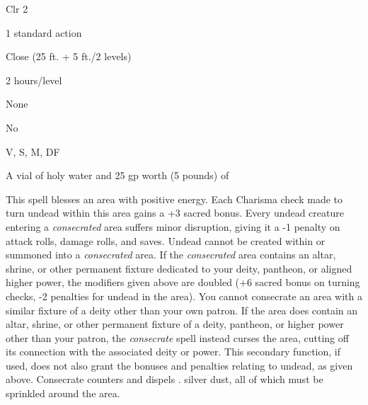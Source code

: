 
\begin{description*}
\item[Level:] Clr 2
\item[Casting Time:] 1 standard action
\item[Range:] Close (25 ft. + 5 ft./2 levels)
\item[Duration:] 2 hours/level
\item[Saving Throw:] None
\item[Spell Resistance:] No
\item[Components:] V, S, M, DF
\item[Arcane Material Component:] A vial of holy water and 25 gp worth (5 pounds) of
\end{description*}

This spell blesses an area with positive energy. Each Charisma check made to turn
undead within this area gains a +3 sacred bonus. Every undead creature entering
a \textit{consecrated} area suffers minor disruption, giving it a -1 penalty on
attack rolls, damage rolls, and saves. Undead cannot be created within or summoned
into a \textit{consecrated} area.
If the \textit{consecrated} area contains an altar, shrine, or other permanent
fixture dedicated to your deity, pantheon, or aligned higher power, the modifiers
given above are doubled (+6 sacred bonus on turning checks, -2 penalties for undead
in the area). You cannot consecrate an area with a similar fixture of a deity other
than your own patron.
If the area does contain an altar, shrine, or other permanent fixture of a deity,
pantheon, or higher power other than your patron, the \textit{consecrate} spell
instead curses the area, cutting off its connection with the associated deity or
power. This secondary function, if used, does not also grant the bonuses and penalties
relating to undead, as given above.
Consecrate counters and dispels .
silver dust, all of which must be sprinkled around the area.